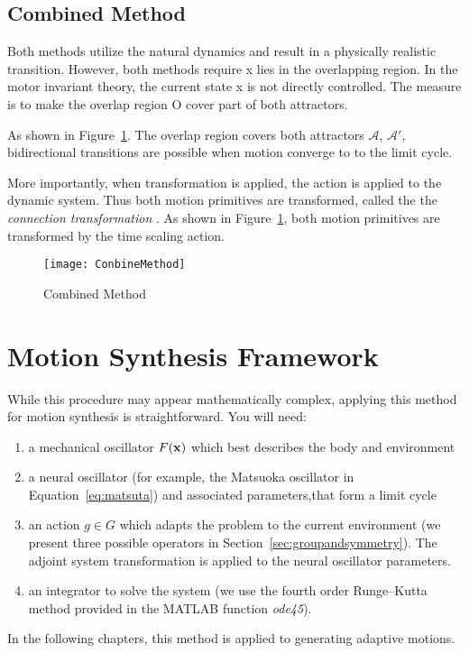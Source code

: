 \subsection{Combined Method}
Both methods utilize the natural dynamics and  result in a physically realistic transition.
However, both methods require x lies in the overlapping region.
In the motor invariant theory, the current state x is not directly controlled. The measure is to make the overlap region O cover part of both attractors.

As shown in Figure~\ref{fig:Combine}.
The overlap region covers both attractors $\mathcal{A}$, $\mathcal{A'}$, bidirectional transitions are possible when motion converge to to the limit cycle.

More importantly, when transformation is applied, the action is applied to the dynamic system. Thus both motion primitives are transformed, called the the \emph{connection transformation }. 
As shown in Figure~\ref{fig:Combine}, both motion primitives are transformed by the time scaling action.

\begin{figure}[!htbp]
  \begin{center}
      \texttt{[image: ConbineMethod]}
    \caption{Combined Method}
    \label{fig:Combine}
  \end{center}
\end{figure}

\section{Motion Synthesis Framework}
\label{sec:procframe}
While this procedure may appear mathematically complex, applying this method for motion synthesis is straightforward. 
You will need:
\begin{enumerate}
\item a mechanical oscillator $F(\mathbf{x})$ which best describes the body and environment
\item a neural oscillator (for example, the Matsuoka oscillator in Equation~\ref{eq:matsuta}) and associated parameters,that form a limit cycle

\item an action $g \in G$ which adapts the problem to the current environment (we present three possible operators in Section~\ref{sec:groupandsymmetry}). 
The adjoint system transformation  is applied to the neural oscillator parameters.

\item an integrator to solve the system (we use the fourth order Runge--Kutta method provided in the {MATLAB} function \emph{ode45}).
\end{enumerate}
In the following chapters, this method is applied to generating adaptive motions.



